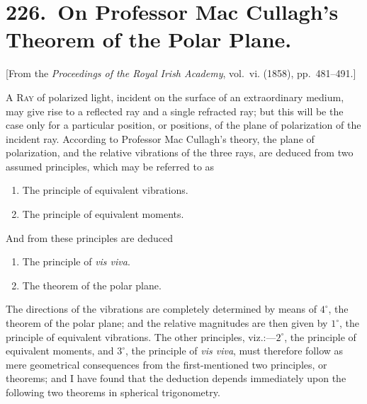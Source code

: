 \documentclass[11pt,a4paper]{book}
\begin{document}
\chapter[On Professor Mac Cullagh's Theorem of the Polar Plane]{226.\ On Professor Mac Cullagh's Theorem of the Polar Plane.}
\label{paper226}

\begin{center}
\small
[From the \textit{Proceedings of the Royal Irish Academy}, vol.~vi. (1858), pp.~481--491.]
\end{center}

\bigskip

\textsc{A Ray} of polarized light, incident on the surface of an extraordinary medium, may give rise to a reflected ray and a single refracted ray; but this will be the case only for a particular position, or positions, of the plane of polarization of the incident ray. According to Professor Mac Cullagh's theory, the plane of polarization, and the relative vibrations of the three rays, are deduced from two assumed principles, which may be referred to as
\begin{enumerate}[label=$\arabic*^{\circ}$.,leftmargin=2em]
\item The principle of equivalent vibrations.
\item The principle of equivalent moments.
\end{enumerate}
And from these principles are deduced
\begin{enumerate}[label=$\arabic*^{\circ}$.,leftmargin=2em,start=3]
\item The principle of \textit{vis viva}.
\item The theorem of the polar plane.
\end{enumerate}

The directions of the vibrations are completely determined by means of $4^{\circ}$, the theorem of the polar plane; and the relative magnitudes are then given by $1^{\circ}$, the principle of equivalent vibrations. The other principles, viz.:---$2^{\circ}$, the principle of equivalent moments, and $3^{\circ}$, the principle of \textit{vis viva}, must therefore follow as mere geometrical consequences from the first-mentioned two principles, or theorems; and I have found that the deduction depends immediately upon the following two theorems in spherical trigonometry.

\bigskip
\end{document}
